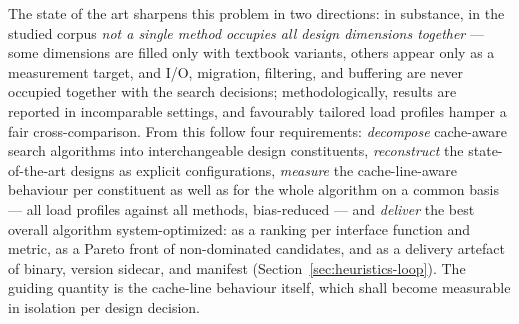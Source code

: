\begin{nurkurz}
The state of the art sharpens this problem in two directions: in substance, in the studied corpus \emph{not a
single method occupies all design dimensions together} --- some dimensions are filled only with textbook
variants, others appear only as a measurement target, and I/O, migration, filtering, and buffering are never
occupied together with the search decisions; methodologically, results are reported in incomparable
settings, and favourably tailored load profiles hamper a fair cross-comparison. From this follow four
requirements: \emph{decompose} cache-aware search algorithms into interchangeable design constituents,
\emph{reconstruct} the state-of-the-art designs as explicit configurations, \emph{measure} the
cache-line-aware behaviour per constituent as well as for the whole algorithm on a common basis --- all load
profiles against all methods, bias-reduced --- and \emph{deliver} the best overall algorithm
system-optimized: as a ranking per interface function and metric, as a Pareto front of non-dominated
candidates, and as a delivery artefact of binary, version sidecar, and manifest
(Section~\ref{sec:heuristics-loop}). The guiding quantity is the cache-line behaviour itself, which shall
become measurable in isolation per design decision.
\end{nurkurz}

